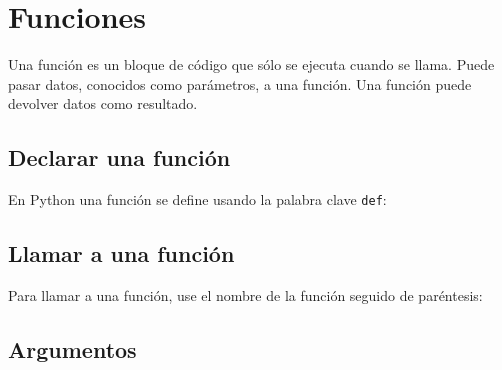 \begin{Shaded}
\begin{Highlighting}[]
\NormalTok{(}\NormalTok{)}
\end{Highlighting}
\end{Shaded}

\section{Funciones}\label{funciones}

Una función es un bloque de código que sólo se ejecuta cuando se llama.
Puede pasar datos, conocidos como parámetros, a una función. Una función
puede devolver datos como resultado.

\subsection{Declarar una función}\label{declarar-una-funciuxf3n}

En Python una función se define usando la palabra clave \texttt{def}:

\begin{Shaded}
\begin{Highlighting}[]
    \NormalTok{(}\NormalTok{)}
\end{Highlighting}
\end{Shaded}

\subsection{Llamar a una función}\label{llamar-a-una-funciuxf3n}

Para llamar a una función, use el nombre de la función seguido de
paréntesis:

\begin{Shaded}
\begin{Highlighting}[]
    \NormalTok{(}\NormalTok{)}

\end{Highlighting}
\end{Shaded}

\subsection{Argumentos}\label{argumentos}

